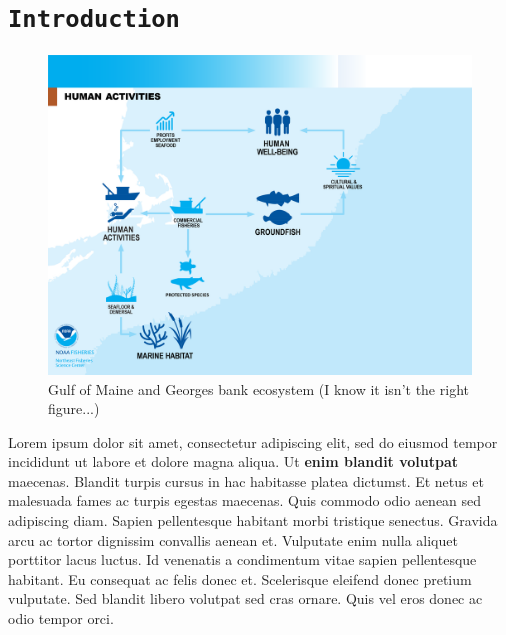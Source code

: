 \documentclass[11pt,]{article}
\title{}
\author{}
\date{}
\begin{document}
\section{\texorpdfstring{\texttt{Introduction}}{Introduction}}\label{introduction}

\begin{figure}
\centering
\includegraphics[width=400pt]{gf_human_activities.png}
\caption{Gulf of Maine and Georges bank ecosystem (I know it isn't the right figure...)}
\label{fig:conceptual}
\end{figure}

Lorem ipsum dolor sit amet, consectetur adipiscing elit, sed do eiusmod
tempor incididunt ut labore et dolore magna aliqua. Ut \textbf{enim
blandit volutpat} maecenas. Blandit turpis cursus in hac habitasse
platea dictumst. Et netus et malesuada fames ac turpis egestas maecenas.
Quis commodo odio aenean sed adipiscing diam. Sapien pellentesque
habitant morbi tristique senectus. Gravida arcu ac tortor dignissim
convallis aenean et. Vulputate enim nulla aliquet porttitor lacus
luctus. Id venenatis a condimentum vitae sapien pellentesque habitant.
Eu consequat ac felis donec et. Scelerisque eleifend donec pretium
vulputate. Sed blandit libero volutpat sed cras ornare. Quis vel eros
donec ac odio tempor orci.
\end{document}
